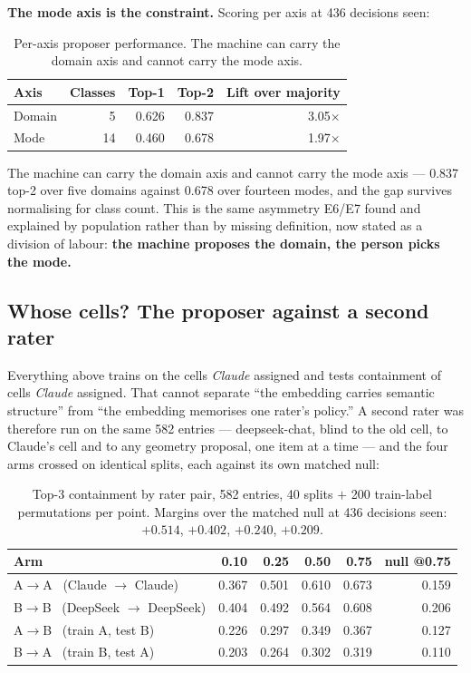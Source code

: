 \documentclass[11pt]{article}
\begin{document}
\textbf{The mode axis is the constraint.} Scoring per axis at 436 decisions
seen:

\begin{table}[h]
\centering
\begin{tabular}{lrrrr}
\toprule
\textbf{Axis} & \textbf{Classes} & \textbf{Top-1} & \textbf{Top-2} & \textbf{Lift over majority} \\
\midrule
Domain & 5 & 0.626 & 0.837 & 3.05$\times$ \\
Mode & 14 & 0.460 & 0.678 & 1.97$\times$ \\
\bottomrule
\end{tabular}
\caption{Per-axis proposer performance. The machine can carry the domain
axis and cannot carry the mode axis.}
\label{tab:axes}
\end{table}

The machine can carry the domain axis and cannot carry the mode axis ---
0.837 top-2 over five domains against 0.678 over fourteen modes, and the
gap survives normalising for class count. This is the same asymmetry E6/E7
found and explained by population rather than by missing definition, now
stated as a division of labour: \textbf{the machine proposes the domain,
the person picks the mode.}

\subsection*{Whose cells? The proposer against a second rater}

Everything above trains on the cells \emph{Claude} assigned and tests
containment of cells \emph{Claude} assigned. That cannot separate ``the
embedding carries semantic structure'' from ``the embedding memorises one
rater's policy.'' A second rater was therefore run on the same 582 entries ---
deepseek-chat, blind to the old cell, to Claude's cell and to any geometry
proposal, one item at a time --- and the four arms crossed on identical
splits, each against its own matched null:

\begin{table}[h]
\centering
\begin{tabular}{lrrrrr}
\toprule
\textbf{Arm} & \textbf{0.10} & \textbf{0.25} & \textbf{0.50} & \textbf{0.75} & \textbf{null @0.75} \\
\midrule
A$\to$A \ (Claude $\to$ Claude)      & 0.367 & 0.501 & 0.610 & 0.673 & 0.159 \\
B$\to$B \ (DeepSeek $\to$ DeepSeek)  & 0.404 & 0.492 & 0.564 & 0.608 & 0.206 \\
A$\to$B \ (train A, test B)          & 0.226 & 0.297 & 0.349 & 0.367 & 0.127 \\
B$\to$A \ (train B, test A)          & 0.203 & 0.264 & 0.302 & 0.319 & 0.110 \\
\bottomrule
\end{tabular}
\caption{Top-3 containment by rater pair, 582 entries, 40 splits $+$ 200
train-label permutations per point. Margins over the matched null at 436
decisions seen: $+0.514$, $+0.402$, $+0.240$, $+0.209$.}
\label{tab:raters}
\end{table}
\end{document}
